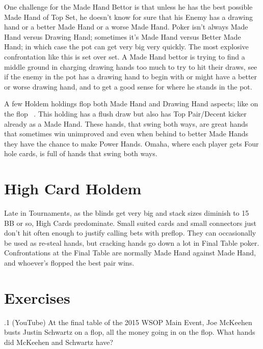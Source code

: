 One challenge for the Made Hand Bettor is that unless he has the best
possible Made Hand of Top Set, he doesn't know for sure that his
Enemy has a drawing hand or a better Made Hand or a worse Made
Hand. Poker isn't always Made Hand versus Drawing Hand; sometimes it's
Made Hand versus Better Made Hand; in which case the pot can get very
big very quickly. The most explosive confrontation like this is set
over set. A Made Hand bettor is trying to find a middle ground in
charging drawing hands too much to try to hit their draws, see if the
enemy in the pot has a drawing hand to begin with or might have a
better or worse drawing hand, and to get a good sense for where he
stands in the pot.

A few Holdem holdings flop both Made Hand and Drawing Hand aspects;
like \Kh\tenh on the flop \Kc\nineh\eigh\ . This holding has a flush
draw but also has Top Pair/Decent kicker already as a Made Hand. These
hands, that swing both ways, are great hands that sometimes win
unimproved and even when behind to better Made Hands they have the
chance to make Power Hands. Omaha, where each player gets Four hole
cards, is full of hands that swing both ways.

\section{High Card Holdem}

Late in Tournaments, as the blinds get very big and stack sizes diminish
to 15 BB or so, High Cards predominate. Small suited cards and small
connectors just don't hit often enough to justify calling bets with
preflop. They can occasionally be used as re-steal hands, but cracking
hands go down a lot in Final Table poker. Confrontations at the Final
Table are normally Made Hand against Made Hand, and whoever's flopped
the best pair wins.

\section{Exercises}


.1 (YouTube) At the final table of the 2015 WSOP Main
Event, Joe McKeehen busts Justin Schwartz on a \sixh\tred\twoh flop,
all the money going in on the flop. What hands did McKeehen and
Schwartz have?

